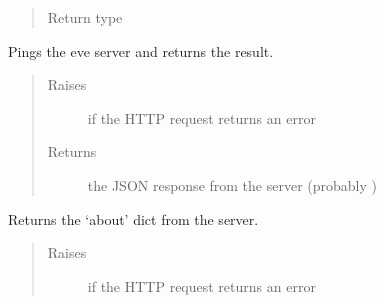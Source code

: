 \documentclass[letterpaper,10pt,english]{sphinxmanual}
\begin{document}
\begin{fulllineitems}
\begin{fulllineitems}
\begin{quote}
\begin{description}
\item[{Return type}] \leavevmode
{}

\end{description}\end{quote}

\end{fulllineitems}


\begin{fulllineitems}
\label{\detokenize{autoapi/pine/client/client/index:pine.client.client.EveClient.ping}}
Pings the eve server and returns the result.
\begin{quote}\begin{description}
\item[{Raises}] \leavevmode
{\hyperref[\detokenize{autoapi/pine/client/exceptions/index:pine.client.exceptions.PineClientHttpException}]{}} \textendash{} if the HTTP request returns an error

\item[{Returns}] \leavevmode
the JSON response from the server (probably )

\end{description}\end{quote}

\end{fulllineitems}


\begin{fulllineitems}
\label{\detokenize{autoapi/pine/client/client/index:pine.client.client.EveClient.about}}
Returns the ‘about’ dict from the server.
\begin{quote}\begin{description}
\item[{Raises}] \leavevmode
{\hyperref[\detokenize{autoapi/pine/client/exceptions/index:pine.client.exceptions.PineClientHttpException}]{}} \textendash{} if the HTTP request returns an error


\end{description}
\end{quote}
\end{fulllineitems}
\end{fulllineitems}
\end{document}
